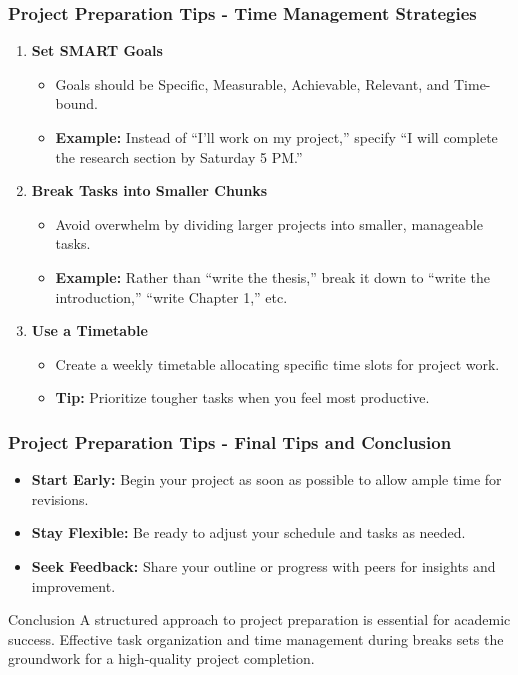 \documentclass[aspectratio=169]{beamer}
\begin{document}
\begin{frame}[fragile]
    \frametitle{Project Preparation Tips - Time Management Strategies}
    \begin{enumerate}
        \item \textbf{Set SMART Goals}
        \begin{itemize}
            \item Goals should be Specific, Measurable, Achievable, Relevant, and Time-bound.
            \item \textbf{Example:} Instead of “I’ll work on my project,” specify “I will complete the research section by Saturday 5 PM.”
        \end{itemize}
        
        \item \textbf{Break Tasks into Smaller Chunks}
        \begin{itemize}
            \item Avoid overwhelm by dividing larger projects into smaller, manageable tasks.
            \item \textbf{Example:} Rather than “write the thesis,” break it down to “write the introduction,” “write Chapter 1,” etc.
        \end{itemize}
        
        \item \textbf{Use a Timetable}
        \begin{itemize}
            \item Create a weekly timetable allocating specific time slots for project work.
            \item \textbf{Tip:} Prioritize tougher tasks when you feel most productive.
        \end{itemize}
    \end{enumerate}
\end{frame}

\begin{frame}[fragile]
    \frametitle{Project Preparation Tips - Final Tips and Conclusion}
    \begin{itemize}
        \item \textbf{Start Early:} Begin your project as soon as possible to allow ample time for revisions.
        \item \textbf{Stay Flexible:} Be ready to adjust your schedule and tasks as needed.
        \item \textbf{Seek Feedback:} Share your outline or progress with peers for insights and improvement.
    \end{itemize}

    \begin{block}{Conclusion}
    A structured approach to project preparation is essential for academic success. Effective task organization and time management during breaks sets the groundwork for a high-quality project completion.
    \end{block}
\end{frame}
\end{document}
